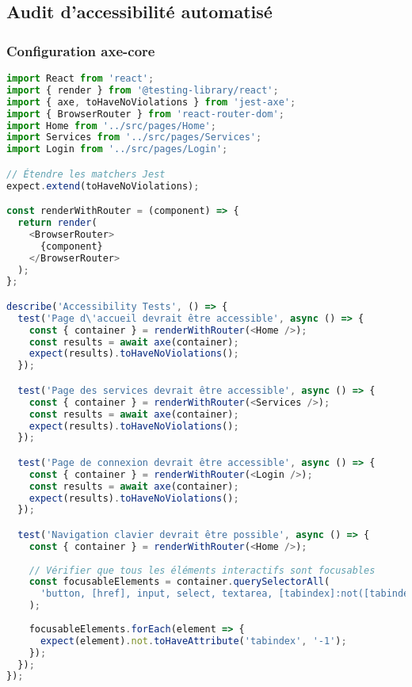 \subsection{Audit d'accessibilité automatisé}

\subsubsection{Configuration axe-core}

\begin{lstlisting}[language=JavaScript, caption=accessibility.test.js]
import React from 'react';
import { render } from '@testing-library/react';
import { axe, toHaveNoViolations } from 'jest-axe';
import { BrowserRouter } from 'react-router-dom';
import Home from '../src/pages/Home';
import Services from '../src/pages/Services';
import Login from '../src/pages/Login';

// Étendre les matchers Jest
expect.extend(toHaveNoViolations);

const renderWithRouter = (component) => {
  return render(
    <BrowserRouter>
      {component}
    </BrowserRouter>
  );
};

describe('Accessibility Tests', () => {
  test('Page d\'accueil devrait être accessible', async () => {
    const { container } = renderWithRouter(<Home />);
    const results = await axe(container);
    expect(results).toHaveNoViolations();
  });

  test('Page des services devrait être accessible', async () => {
    const { container } = renderWithRouter(<Services />);
    const results = await axe(container);
    expect(results).toHaveNoViolations();
  });

  test('Page de connexion devrait être accessible', async () => {
    const { container } = renderWithRouter(<Login />);
    const results = await axe(container);
    expect(results).toHaveNoViolations();
  });

  test('Navigation clavier devrait être possible', async () => {
    const { container } = renderWithRouter(<Home />);
    
    // Vérifier que tous les éléments interactifs sont focusables
    const focusableElements = container.querySelectorAll(
      'button, [href], input, select, textarea, [tabindex]:not([tabindex="-1"])'
    );
    
    focusableElements.forEach(element => {
      expect(element).not.toHaveAttribute('tabindex', '-1');
    });
  });
});
\end{lstlisting}

